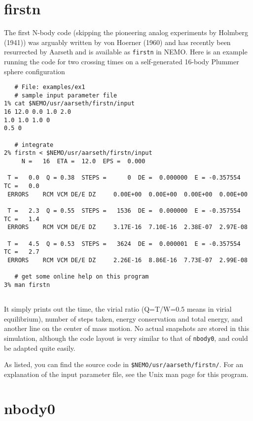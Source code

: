 \section{firstn}

The first N-body code (skipping the pioneering analog experiments by 
Holmberg (1941))
was arguably written by von Hoerner (1960)  %
and has recently
been resurrected by Aarseth and is available as {\tt firstn} in NEMO. Here is an
example running the code for two crossing times on a self-generated 16-body
Plummer sphere configuration

\footnotesize\begin{verbatim}
   # File: examples/ex1
   # sample input parameter file
1% cat $NEMO/usr/aarseth/firstn/input
16 12.0 0.0 1.0 2.0
1.0 1.0 1.0 0
0.5 0

   # integrate 
2% firstn < $NEMO/usr/aarseth/firstn/input
     N =   16  ETA =  12.0  EPS =  0.000
 
 T =   0.0  Q = 0.38  STEPS =      0  DE =  0.000000  E = -0.357554  TC =   0.0
 ERRORS    RCM VCM DE/E DZ     0.00E+00  0.00E+00  0.00E+00  0.00E+00
 
 T =   2.3  Q = 0.55  STEPS =   1536  DE =  0.000000  E = -0.357554  TC =   1.4
 ERRORS    RCM VCM DE/E DZ     3.17E-16  7.10E-16  2.38E-07  2.97E-08
 
 T =   4.5  Q = 0.53  STEPS =   3624  DE =  0.000001  E = -0.357554  TC =   2.7
 ERRORS    RCM VCM DE/E DZ     2.26E-16  8.86E-16  7.73E-07  2.99E-08

   # get some online help on this program
3% man firstn
 
\end{verbatim}\normalsize

It simply prints out the time, the virial ratio (Q=T/W=0.5 means in virial
equilibrium), number of steps taken, energy conservation and total energy, and another 
line on the center of mass motion. No actual snapshots are stored in this 
simulation, although the code layout is very similar to that of {\tt nbody0},
and could be adapted quite easily.

As listed, you can find the source code in {\tt \$NEMO/usr/aarseth/firstn/}. For 
an explanation of the input parameter file, see the Unix man page for this program.

\section{nbody0}

